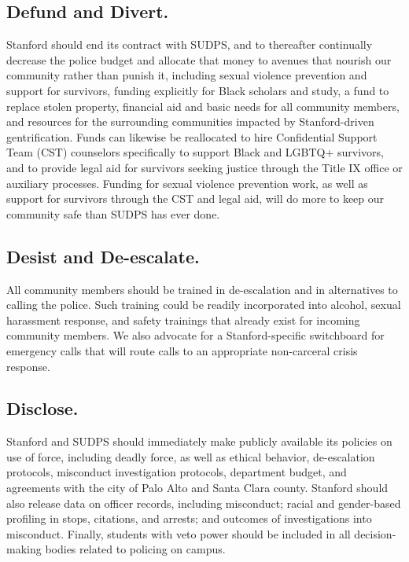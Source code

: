 \documentclass[12pt, titlepage, letterpaper]{article}
\begin{document}
\subsection*{Defund and Divert.}
%
Stanford should end its contract with SUDPS, and to thereafter continually decrease the police budget and allocate that money to avenues that nourish our community rather than punish it, including sexual violence prevention and support for survivors, funding explicitly for Black scholars and study, a fund to replace stolen property, financial aid and basic needs for all community members, and resources for the surrounding communities impacted by Stanford-driven gentrification. Funds can likewise be reallocated to hire Confidential Support Team (CST) counselors specifically to support Black and LGBTQ+ survivors, and to provide legal aid for survivors seeking justice through the Title IX office or auxiliary processes. Funding for sexual violence prevention work, as well as support for survivors through the CST and legal aid, will do more to keep our community safe than SUDPS has ever done. 

\subsection*{Desist and De-escalate.}
%
All community members should be trained in de-escalation and in alternatives to calling the police. Such training could be readily incorporated into alcohol, sexual harassment response, and safety trainings that already exist for incoming community members. We also advocate for a Stanford-specific switchboard for emergency calls that will route calls to an appropriate non-carceral crisis response.  

\subsection*{Disclose.}
%
Stanford and SUDPS should immediately make publicly available its policies on use of force, including deadly force, as well as ethical behavior, de-escalation protocols, misconduct investigation protocols, department budget, and agreements with the city of Palo Alto and Santa Clara county. Stanford should also release data on officer records, including misconduct; racial and gender-based profiling in stops, citations, and arrests; and outcomes of investigations into misconduct. Finally, students with veto power should be included in all decision-making bodies related to policing on campus.
\end{document}
